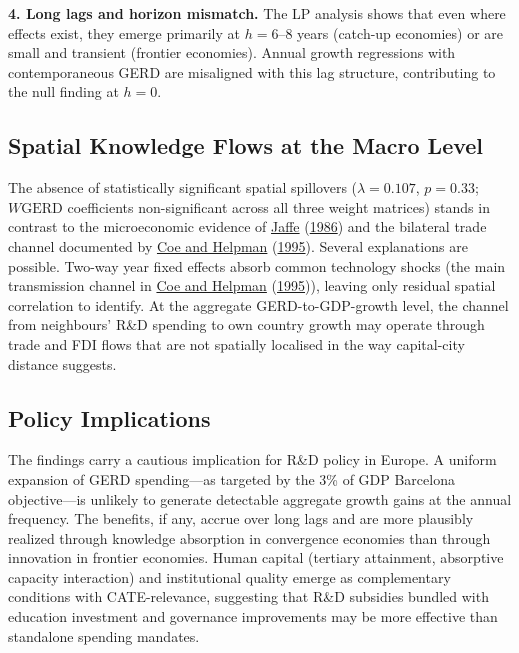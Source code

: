 \documentclass[
  11pt,
]{article}
\begin{document}
\textbf{4. Long lags and horizon mismatch.} The LP analysis shows that even where effects exist, they emerge primarily at \(h = 6\)--\(8\) years (catch-up economies) or are small and transient (frontier economies). Annual growth regressions with contemporaneous GERD are misaligned with this lag structure, contributing to the null finding at \(h = 0\).

\hypertarget{spatial-knowledge-flows-at-the-macro-level}{%
\subsection{Spatial Knowledge Flows at the Macro Level}\label{spatial-knowledge-flows-at-the-macro-level}}

The absence of statistically significant spatial spillovers (\(\lambda = 0.107\), \(p = 0.33\); \(W\text{GERD}\) coefficients non-significant across all three weight matrices) stands in contrast to the microeconomic evidence of \protect\hyperlink{ref-jaffe1986}{Jaffe} (\protect\hyperlink{ref-jaffe1986}{1986}) and the bilateral trade channel documented by \protect\hyperlink{ref-coe1995}{Coe and Helpman} (\protect\hyperlink{ref-coe1995}{1995}). Several explanations are possible. Two-way year fixed effects absorb common technology shocks (the main transmission channel in \protect\hyperlink{ref-coe1995}{Coe and Helpman} (\protect\hyperlink{ref-coe1995}{1995})), leaving only residual spatial correlation to identify. At the aggregate GERD-to-GDP-growth level, the channel from neighbours' R\&D spending to own country growth may operate through trade and FDI flows that are not spatially localised in the way capital-city distance suggests.

\hypertarget{policy-implications}{%
\subsection{Policy Implications}\label{policy-implications}}

The findings carry a cautious implication for R\&D policy in Europe. A uniform expansion of GERD spending---as targeted by the 3\% of GDP Barcelona objective---is unlikely to generate detectable aggregate growth gains at the annual frequency. The benefits, if any, accrue over long lags and are more plausibly realized through knowledge absorption in convergence economies than through innovation in frontier economies. Human capital (tertiary attainment, absorptive capacity interaction) and institutional quality emerge as complementary conditions with CATE-relevance, suggesting that R\&D subsidies bundled with education investment and governance improvements may be more effective than standalone spending mandates.
\end{document}
